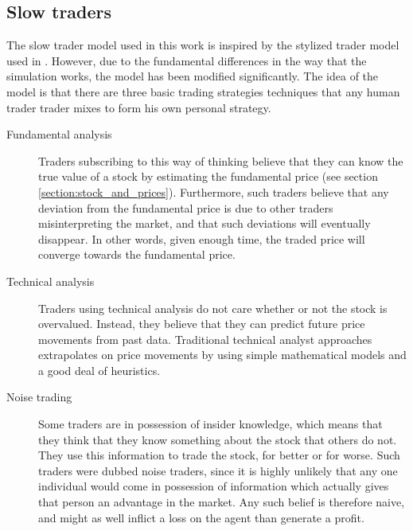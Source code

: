 \subsection{Slow traders}\label{section:slow_traders}
The slow trader model used in this work is inspired by the stylized trader model used in \cite{chiwang2013investigating, chiarella2009impact, gsell2008assessing}. However, due to the fundamental differences in the way that the simulation works, the model has been modified significantly. 
The idea of the model is that there are three basic trading strategies techniques that any human trader trader mixes to form his own personal strategy. 
\begin{description}
\item[Fundamental analysis] Traders subscribing to this way of thinking believe that they can know the true value of a stock by estimating the fundamental price (see section \ref{section:stock_and_prices}). Furthermore, such traders believe that any deviation from the fundamental price is due to other traders misinterpreting the market, and that such deviations will eventually disappear. In other words, given enough time, the traded price will converge towards the fundamental price. 
\item[Technical analysis] Traders using technical analysis do not care whether or not the stock is overvalued. Instead, they believe that they can predict future price movements from past data. Traditional technical analyst approaches extrapolates on price movements by using simple mathematical models and a good deal of heuristics.
\item[Noise trading] Some traders are in possession of insider knowledge, which means that they think that they know something about the stock that others do not. They use this information to trade the stock, for better or for worse. Such traders were dubbed noise traders, since it is highly unlikely that any one individual would come in possession of information which actually gives that person an advantage in the market. Any such belief is therefore naive, and might as well inflict a loss on the agent than generate a profit.
\end{description}

